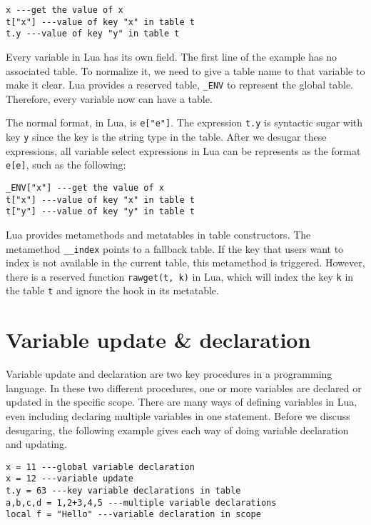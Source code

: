 \begin{verbatim}
x ---get the value of x
t["x"] ---value of key "x" in table t
t.y ---value of key "y" in table t
\end{verbatim}

Every variable in Lua has its own field. 
The first line of the example has no associated table.
To normalize it, we need to give a table name to that variable to make it clear.
Lua provides a reserved table, {\tt \_ENV} to represent the global table. Therefore, every variable now can have a table.

The normal format, in Lua, is {\tt e["e"]}. 
The expression {\tt t.y} is syntactic sugar with key {\tt y} since the key is the string type in the table. After we desugar these expressions, all variable select expressions in Lua can be represents as the format {\tt e[e]}, such as the following:

\begin{verbatim}
_ENV["x"] ---get the value of x
t["x"] ---value of key "x" in table t
t["y"] ---value of key "y" in table t
\end{verbatim}

Lua provides metamethods and metatables in table constructors. The metamethod {\tt \_\_index} points to a fallback table. If the key that users want to index is not available in the current table, this metamethod is triggered. However, there is a reserved function {\tt rawget(t, k)} in Lua, which will index the key {\tt k} in the table {\tt t} and ignore the hook in its metatable.

\section{Variable update \& declaration}
Variable update and declaration are two key procedures in a programming language. 
In these two different procedures, one or more variables are declared or updated in the specific scope. There are many ways of defining variables in Lua, even including declaring multiple variables in one statement. Before we discuss desugaring, the following example gives each way of doing variable declaration and updating.

\begin{verbatim}
x = 11 ---global variable declaration
x = 12 ---variable update
t.y = 63 ---key variable declarations in table
a,b,c,d = 1,2+3,4,5 ---multiple variable declarations
local f = "Hello" ---variable declaration in scope
\end{verbatim}

